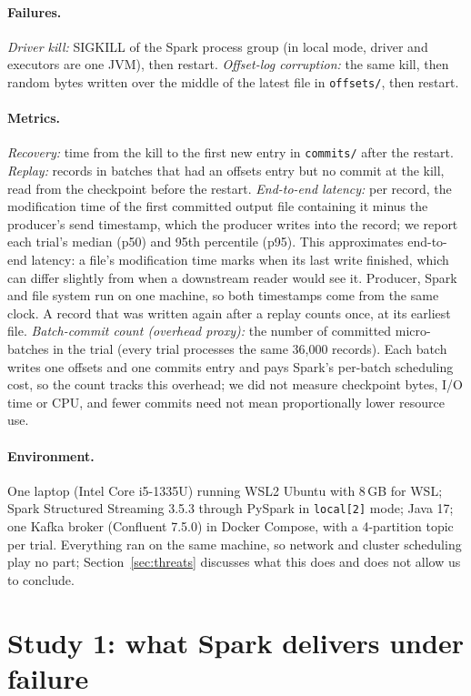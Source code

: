 \documentclass[10pt,twocolumn]{article}
\begin{document}
\paragraph{Failures.}
\emph{Driver kill:} SIGKILL of the Spark process group (in local mode, driver
and executors are one JVM), then restart. \emph{Offset-log corruption:} the same
kill, then random bytes written over the middle of the latest file in
\texttt{offsets/}, then restart.

\paragraph{Metrics.}
\emph{Recovery:} time from the kill to the first new entry in \texttt{commits/}
after the restart. \emph{Replay:} records in batches that had an offsets entry
but no commit at the kill, read from the checkpoint before the restart.
\emph{End-to-end latency:} per record, the modification time of the first
committed output file containing it minus the producer's send timestamp, which
the producer writes into the record; we report each trial's median (p50) and
95th percentile (p95). This approximates end-to-end latency: a file's
modification time marks when its last write finished, which can differ slightly
from when a downstream reader would see it. Producer, Spark and file system run
on one machine, so both timestamps come from the same clock. A record that was
written again after a replay counts once, at its earliest file.
\emph{Batch-commit count (overhead proxy):} the number of committed
micro-batches in the trial (every trial processes the same 36{,}000 records).
Each batch writes one offsets and one commits entry and pays Spark's per-batch
scheduling cost, so the count tracks this overhead; we did not measure
checkpoint bytes, I/O time or CPU, and fewer commits need not mean
proportionally lower resource use.

\paragraph{Environment.}
One laptop (Intel Core i5-1335U) running WSL2 Ubuntu with 8\,GB for WSL;
Spark Structured Streaming 3.5.3 through PySpark in \texttt{local[2]} mode;
Java 17; one Kafka broker (Confluent 7.5.0) in Docker Compose, with a
4-partition topic per trial. Everything ran on the same machine, so network and
cluster scheduling play no part; Section~\ref{sec:threats} discusses what this
does and does not allow us to conclude.

\section{Study 1: what Spark delivers under failure}
\label{sec:study1}
\end{document}
